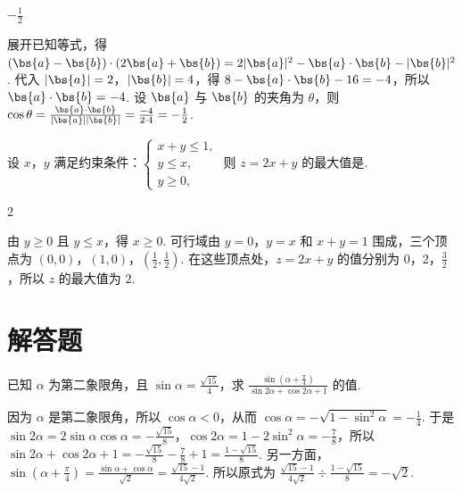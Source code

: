 \begin{answer}
\(-\frac{1}{2}\)
\end{answer}

\begin{solution}
展开已知等式，得 \((\bs{a}-\bs{b})\cdot(2\bs{a}+\bs{b})=2|\bs{a}|^2-\bs{a}\cdot\bs{b}-|\bs{b}|^2\). 代入 \(|\bs{a}|=2\)，\(|\bs{b}|=4\)，得 \(8-\bs{a}\cdot\bs{b}-16=-4\)，所以 \(\bs{a}\cdot\bs{b}=-4\). 设 \(\bs{a}\) 与 \(\bs{b}\) 的夹角为 \(\theta\)，则 \(\cos\theta=\frac{\bs{a}\cdot\bs{b}}{|\bs{a}||\bs{b}|}=\frac{-4}{2\cdot4}=-\frac{1}{2}\).
\end{solution}

\begin{problem}
设 \(x\)，\(y\) 满足约束条件：\(\begin{cases}
x + y \leqslant 1,\\
y \leqslant x,\\
y \geqslant 0,
\end{cases}\) 则 \(z = 2x + y\) 的最大值是\fillinblank{}.
\end{problem}

\begin{answer}
2
\end{answer}

\begin{solution}
由 \(y\geqslant0\) 且 \(y\leqslant x\)，得 \(x\geqslant0\). 可行域由 \(y=0\)，\(y=x\) 和 \(x+y=1\) 围成，三个顶点为 \((0,0)\)，\((1,0)\)，\((\frac{1}{2},\frac{1}{2})\). 在这些顶点处，\(z=2x+y\) 的值分别为 \(0\)，\(2\)，\(\frac{3}{2}\)，所以 \(z\) 的最大值为 \(2\).
\end{solution}

\section{解答题}
\begin{problem}
已知 \(\alpha\) 为第二象限角，且 \(\sin \alpha = \frac{\sqrt{15}}{4}\)，求 \(\frac{\sin (\alpha + \frac{\pi}{4})}{\sin 2\alpha + \cos 2\alpha + 1}\) 的值.
\end{problem}

\begin{solution}
因为 \(\alpha\) 是第二象限角，所以 \(\cos\alpha<0\)，从而 \(\cos\alpha=-\sqrt{1-\sin^2\alpha}=-\frac{1}{4}\). 于是 \(\sin2\alpha=2\sin\alpha\cos\alpha=-\frac{\sqrt{15}}{8}\)，\(\cos2\alpha=1-2\sin^2\alpha=-\frac{7}{8}\)，所以 \(\sin2\alpha+\cos2\alpha+1=-\frac{\sqrt{15}}{8}-\frac{7}{8}+1=\frac{1-\sqrt{15}}{8}\). 另一方面，\(\sin\left(\alpha+\frac{\pi}{4}\right)=\frac{\sin\alpha+\cos\alpha}{\sqrt{2}}=\frac{\sqrt{15}-1}{4\sqrt{2}}\). 所以原式为 \(\frac{\sqrt{15}-1}{4\sqrt{2}}\div\frac{1-\sqrt{15}}{8}=-\sqrt{2}\).
\end{solution}

